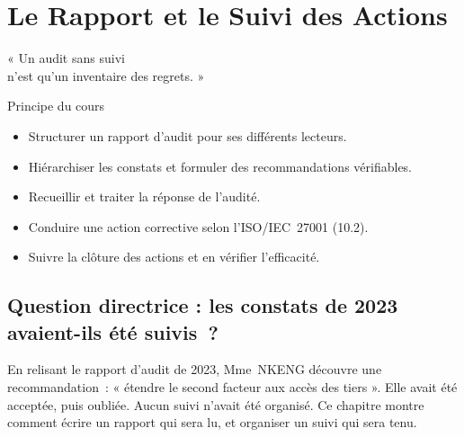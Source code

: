 
\chapter{Le Rapport et le Suivi des Actions}
\label{chap:rapport}

\epigraph{%
    « Un audit sans suivi\\
    n'est qu'un inventaire des regrets. »%
}{Principe du cours}


\begin{boxobjectifs}
\begin{itemize}
    \item Structurer un rapport d'audit pour ses différents lecteurs.
    \item Hiérarchiser les constats et formuler des recommandations
          vérifiables.
    \item Recueillir et traiter la réponse de l'audité.
    \item Conduire une action corrective selon l'ISO/IEC~27001 (10.2).
    \item Suivre la clôture des actions et en vérifier l'efficacité.
\end{itemize}
\end{boxobjectifs}

\bigskip

\section*{Question directrice : les constats de 2023 avaient-ils été suivis~?}

En relisant le rapport d'audit de 2023, Mme~NKENG découvre une
recommandation~: « étendre le second facteur aux accès des tiers ». Elle
avait été acceptée, puis oubliée. Aucun suivi n'avait été organisé. Ce
chapitre montre comment écrire un rapport qui sera lu, et organiser un
suivi qui sera tenu.

